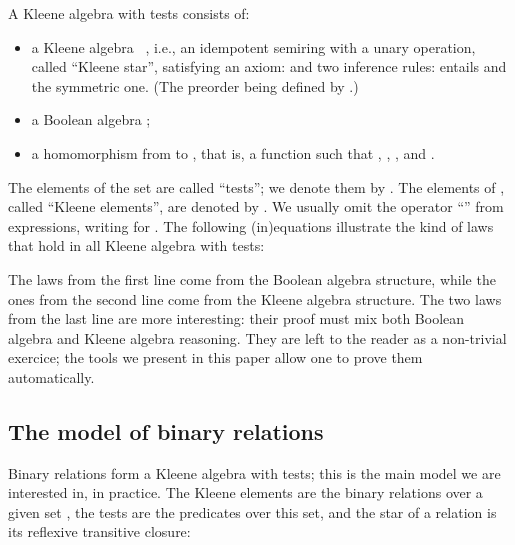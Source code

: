 \documentclass[a4paper]{llncs}
\newif\iflong\longfalse
\begin{document}
A Kleene algebra with tests consists of:
\begin{itemize}
\item a Kleene algebra
  ~\cite{kozen94:ka:completeness},
  i.e., an idempotent semiring with a unary operation, called ``Kleene
  star'', satisfying an axiom:  and two
  inference rules:  entails 
  and the symmetric one.  (The preorder  being defined by .)
\item a Boolean algebra ;
\item a homomorphism from  to
  , that is, a function 
  such that , , ,
  and .
\end{itemize}
\iflong
(Kozen actually uses a slightly different
definition~\cite{kozen:97:kat}, where  is a subset of , and the
homomorphism is the identity map. While this yields to a more concise
syntax for paper proofs, it is more natural and easier in Coq to use
types to distinguish the two sorts  and .)
\fi
The elements of the set  are called ``tests''; we denote them by
. The elements of , called ``Kleene elements'', are denoted by
. We usually omit the operator ``'' from expressions,
writing  for . The following (in)equations illustrate the
kind of laws that hold in all Kleene algebra with tests:
The laws from the first line come from the Boolean algebra structure,
while the ones from the second line come from the Kleene algebra
structure. The two laws from the last line are more interesting: their
proof must mix both Boolean algebra and Kleene algebra
reasoning. They are left to the reader as a non-trivial exercice; the
tools we present in this paper allow one to prove them automatically.

\subsection{The model of binary relations}
\label{ssec:rel:model}

Binary relations form a Kleene algebra with tests; this is the main
model we are interested in, in practice. The Kleene elements are the
binary relations over a given set , the tests are the predicates
over this set, and the star of a relation is its reflexive transitive
closure:
\end{document}
